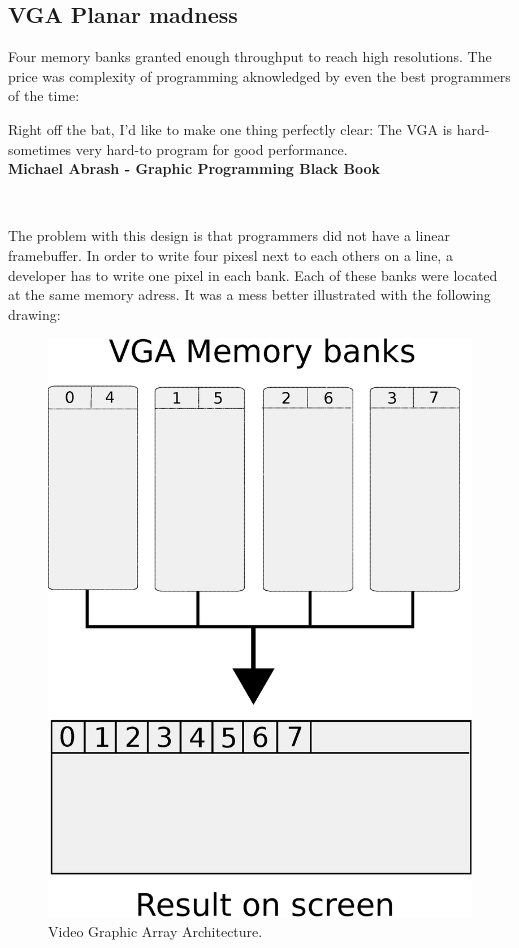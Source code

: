\documentclass[book.tex]{subfiles}
\begin{document}
\subsection{VGA Planar madness}

Four memory banks granted enough throughput to reach high resolutions. The price was complexity of programming aknowledged by even the best programmers of the time:\\

 \begin{fancyquotes}
   Right off the bat, I'd like to make one thing perfectly clear: The VGA is hard-sometimes very hard-to program for good performance.
 \bigskip \\
\textbf{Michael Abrash - Graphic Programming Black Book}
 \end{fancyquotes}
 \\
\par
The problem with this design is that programmers did not have a linear framebuffer. In order to write four pixesl next to each others on a line, a developer has to write one pixel in each bank. Each of these banks were located at the same memory adress. It was a mess better illustrated with the following drawing:\\
\par
\begin{figure}[H]
\centering
\includegraphics[width=\textwidth]{imgs/vga_ram_screen_layout.eps}
\caption{Video Graphic Array Architecture.}
\label{fig:vga_arch}
\end{figure}
\end{document}
